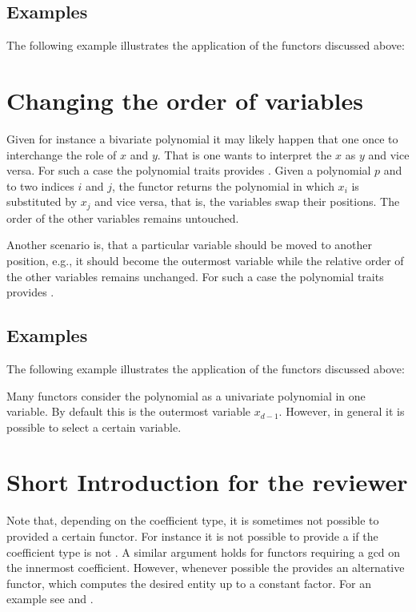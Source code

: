 \subsection{Examples}
The following example illustrates the application of the functors discussed above:

\section{Changing the order of variables}

Given for instance a bivariate polynomial it may likely happen that one once to 
interchange the role of $x$ and $y$. That is one wants to interpret the $x$ as $y$ 
and vice versa. For such a case the polynomial traits provides . 
Given a polynomial $p$ and to two indices $i$ and $j$, the functor returns the polynomial 
in which $x_i$ is substituted by $x_j$ and vice versa, that is, the variables swap their positions.
The order of the other variables remains untouched. 

Another scenario is, that a particular variable should be moved to another position, e.g., it should become the 
outermost variable while the relative order of the other variables remains unchanged. 
For such a case the polynomial traits provides .


\subsection{Examples}
The following example illustrates the application of the functors discussed above:









Many functors consider the polynomial as a univariate polynomial in one variable.
By default this is the outermost variable $x_{d-1}$. However, in general it 
is possible to select a certain variable. 






\section{Short Introduction for the reviewer}


Note that, depending on the coefficient type,  
it is sometimes not possible to provided a certain functor. 
For instance it is not possible to provide  a  if the coefficient type
is not . A similar argument holds for functors requiring  
a gcd on the innermost coefficient. However, whenever possible the 
 provides an alternative functor, which computes the 
desired entity up to a constant factor. For an example see 
 and .

